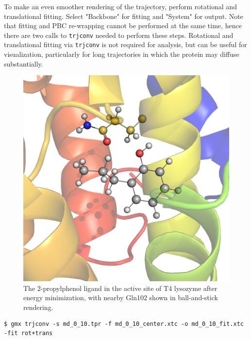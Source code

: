 \documentclass[9pt,tutorial,pubversion]{livecoms}
\begin{document}
To make an even smoother rendering of the trajectory, perform rotational and translational fitting. Select "Backbone" for fitting and "System" for output. Note that fitting and PBC re-wrapping cannot be performed at the same time, hence there are two calls to \texttt{trjconv} needed to perform these steps. Rotational and translational fitting via \texttt{trjconv} is not required for analysis, but can be useful for visualization, particularly for long trajectories in which the protein may diffuse substantially.

\begin{figure}[ht!]
\centering
\includegraphics{3htb_jz4_zoom}
\caption{The 2-propylphenol ligand in the active site of T4 lysozyme after energy minimization, with nearby Gln102 shown in ball-and-stick rendering.}
\label{3htb_jz4_zoom_fig}
\end{figure}

\begin{lstlisting}
$ gmx trjconv -s md_0_10.tpr -f md_0_10_center.xtc -o md_0_10_fit.xtc -fit rot+trans
\end{lstlisting}
\end{document}
